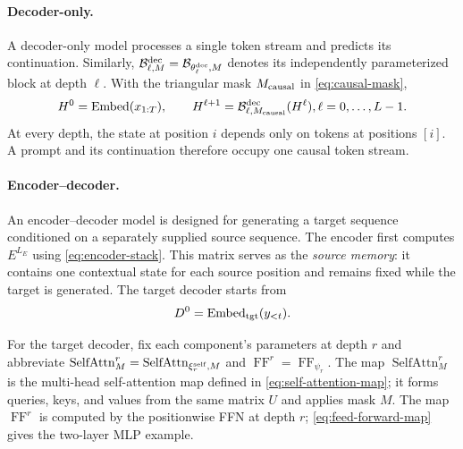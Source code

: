 \documentclass[11pt,twoside]{article}
\theoremstyle{plain}
\theoremstyle{definition}
\theoremstyle{remark}
\begin{document}
\paragraph{Decoder-only.}
A decoder-only model processes a single token stream and predicts its
continuation. Similarly,
$\mathcal B^{\rm dec}_{\ell,M}=\mathcal B_{\theta^{\rm dec}_\ell,M}$ denotes
its independently parameterized block at depth $\ell$.
With the triangular mask $M_{\rm causal}$ in \eqref{eq:causal-mask},
\begin{equation}
H^0=\operatorname{Embed}(x_{1:T}),
\qquad
H^{\ell+1}=\mathcal B^{\rm dec}_{\ell,M_{\rm causal}}(H^\ell),
\quad \ell=0,\ldots,L-1.
\label{eq:decoder-only-stack}
\end{equation}
At every depth, the state at position $i$ depends only on tokens at positions
$[i]$. A prompt and its continuation therefore occupy one causal token
stream.

\paragraph{Encoder--decoder.}
An encoder--decoder model is designed for generating a target sequence
conditioned on a separately supplied source sequence. The encoder first
computes $E^{L_E}$ using \eqref{eq:encoder-stack}. This matrix serves as the
\emph{source memory}: it contains one contextual state for each source
position and remains fixed while the target is generated. The target decoder
starts from
\begin{equation}
D^0=\operatorname{Embed}_{\rm tgt}(y_{<t}).
\end{equation}

For the target decoder, fix each component's parameters at depth $r$ and
abbreviate
$\operatorname{SelfAttn}^r_M=\operatorname{SelfAttn}_{\xi^{\rm self}_r,M}$ and
$\operatorname{FF}^r=\operatorname{FF}_{\psi_r}$.
The map $\operatorname{SelfAttn}^r_M$ is the multi-head self-attention map defined
in \eqref{eq:self-attention-map}; it forms queries, keys, and values from the
same matrix $U$ and applies mask $M$. The map $\operatorname{FF}^r$ is computed
by the positionwise FFN at depth $r$; \eqref{eq:feed-forward-map} gives the
two-layer MLP example.
\end{document}
